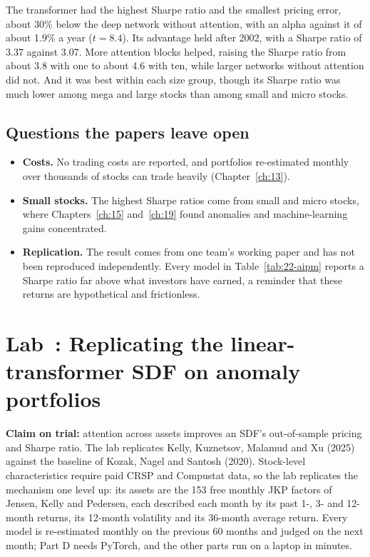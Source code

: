 The transformer had the highest Sharpe ratio and the smallest pricing error, about 30\% below the deep network without attention, with an alpha against it of about 1.9\% a year ($t = 8.4$). Its advantage held after 2002, with a Sharpe ratio of 3.37 against 3.07. More attention blocks helped, raising the Sharpe ratio from about 3.8 with one to about 4.6 with ten, while larger networks without attention did not. And it was best within each size group, though its Sharpe ratio was much lower among mega and large stocks than among small and micro stocks.

\subsection{Questions the papers leave open}

\begin{itemize}
  \item \textbf{Costs.} No trading costs are reported, and portfolios re-estimated monthly over thousands of stocks can trade heavily (Chapter~\ref{ch:13}).
  \item \textbf{Small stocks.} The highest Sharpe ratios come from small and micro stocks, where Chapters~\ref{ch:15} and~\ref{ch:19} found anomalies and machine-learning gains concentrated.
  \item \textbf{Replication.} The result comes from one team's working paper and has not been reproduced independently. Every model in Table~\ref{tab:22-aipm} reports a Sharpe ratio far above what investors have earned, a reminder that these returns are hypothetical and frictionless.
\end{itemize}

\section{Lab~\thechapter: Replicating the linear-transformer SDF on anomaly portfolios}
\label{sec:22-lab}

\textbf{Claim on trial:} attention across assets improves an SDF's out-of-sample pricing and Sharpe ratio. The lab replicates Kelly, Kuznetsov, Malamud and Xu (2025) against the baseline of Kozak, Nagel and Santosh (2020). Stock-level characteristics require paid CRSP and Compustat data, so the lab replicates the mechanism one level up: its assets are the 153 free monthly JKP factors of Jensen, Kelly and Pedersen, each described each month by its past 1-, 3- and 12-month returns, its 12-month volatility and its 36-month average return. Every model is re-estimated monthly on the previous 60 months and judged on the next month; Part D needs PyTorch, and the other parts run on a laptop in minutes.

